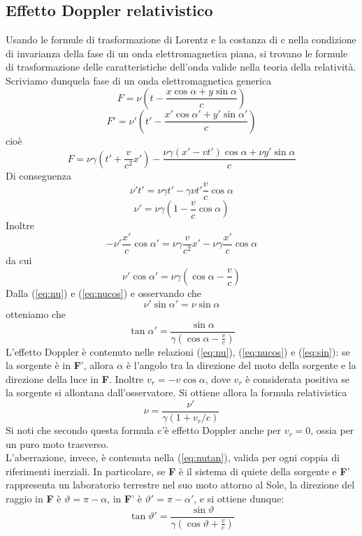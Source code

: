 \documentclass[a4paper,11pt]{book}
\theoremstyle{plain}
\theoremstyle{definition}
\begin{document}
\subsection{Effetto Doppler relativistico}
Usando le formule di trasformazione di Lorentz e la costanza di c nella condizione di invarianza della fase di un onda elettromagnetica piana, si trovano le formule di trasformazione delle caratteristiche dell'onda valide nella teoria della relatività. Scriviamo dunquela fase di un onda elettromagnetica generica
\[
F=\nu \left( t-\frac{x\cos\alpha+y\sin\alpha}{c} \right)
\]
\[
F'=\nu' \left( t'-\frac{x'\cos\alpha'+y'\sin\alpha'}{c} \right)
\]
cioè
\[
F=\nu\gamma \left( t'+\frac{v}{c^2}x' \right)-\frac{\nu\gamma(x'-vt')\cos\alpha+\nu y'\sin\alpha}{c}
\]
Di conseguenza
\[
\nu' t'=\nu\gamma t' -\gamma \nu t' \frac{v}{c}\cos\alpha 
\]
\begin{equation}\label{eq:nu}
 \nu' = \nu \gamma \left( 1-\frac{v}{c}\cos\alpha \right)
\end{equation}
Inoltre
\[
-\nu'\frac{x'}{c}\cos\alpha' = \nu \gamma\frac{v}{c^2}x'-\nu\gamma \frac{x'}{c}\cos\alpha
\]
da cui
\begin{equation}\label{eq:nucos}
\nu'\cos\alpha' = \nu\gamma \left(\cos\alpha-\frac{v}{c} \right)
\end{equation} 
Dalla (\ref{eq:nu}) e (\ref{eq:nucos}) e osservando che
\begin{equation}\label{eq:sin}
\nu'\sin\alpha' = \nu\sin\alpha
\end{equation}
otteniamo che
\begin{equation}\label{eq:nutan}
\tan\alpha' = \frac{\sin\alpha}{\gamma \left( \cos\alpha-\frac{v}{c} \right)}
\end{equation}
L'effetto Doppler è contenuto nelle relazioni (\ref{eq:nu}), (\ref{eq:nucos}) e (\ref{eq:sin}): se la sorgente è in \textbf{F}', allora $\alpha$ è l'angolo tra la direzione del moto della sorgente e la direzione della luce in \textbf{F}. Inoltre $v_r = -v\cos\alpha$, dove $v_r$ è considerata positiva se la sorgente si allontana dall'osservatore. Si ottiene allora la formula relativistica
\begin{equation}
\nu = \frac{\nu'}{\gamma(1+v_r/c)}
\end{equation}
Si noti che secondo questa formula c'è effetto Doppler anche per $v_r=0$, ossia per un puro moto trasverso. \\
L'aberrazione, invece, è contenuta nella (\ref{eq:nutan}), valida per ogni coppia di riferimenti inerziali. In particolare, se \textbf{F} è il sistema di quiete della sorgente e \textbf{F}' rappresenta un laboratorio terrestre nel suo moto attorno al Sole, la direzione del raggio in \textbf{F} è $\vartheta=\pi-\alpha$, in \textbf{F}' è $\vartheta'=\pi-\alpha'$, e si ottiene dunque:
\[
\tan\vartheta' = \frac{\sin\vartheta}{\gamma \left( \cos\vartheta+\frac{v}{c} \right)}
\]
\end{document}
